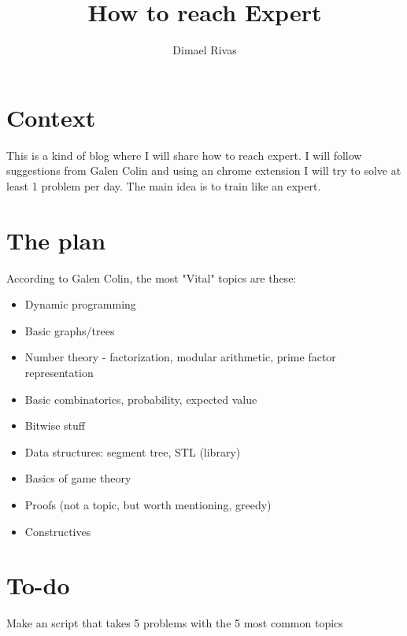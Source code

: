 \documentclass[]{article}
\title{How to reach Expert}
\author{Dimael Rivas}
\begin{document}
\maketitle



\section{Context}
This is a kind of blog where I will share how to reach expert. I will follow suggestions from Galen Colin and using an chrome extension I will try to solve at least 1 problem per day. The main idea is to train like an expert.

\section{The plan}
According to Galen Colin, the most "Vital" topics are these:
\begin{itemize}
	\item Dynamic programming
	\item Basic graphs/trees
	\item Number theory - factorization, modular arithmetic, prime factor representation
	\item Basic combinatorics, probability, expected value
	\item Bitwise stuff
	\item Data structures: segment tree, STL (library)
	\item Basics of game theory
	\item Proofs (not a topic, but worth mentioning, greedy)
	\item Constructives
\end{itemize}


\section{To-do}
Make an script that takes 5 problems with the 5 most common topics
\end{document}
